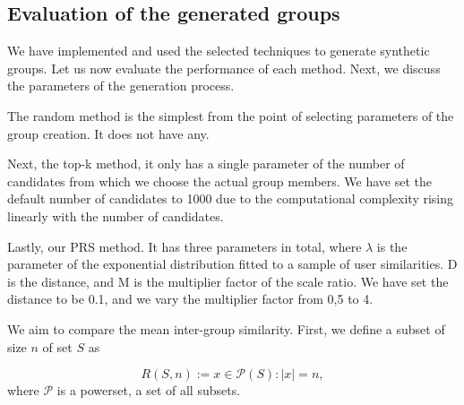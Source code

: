 

\subsection{Evaluation of the generated groups} \label{subsec:04_creation_of_artificial_groups.evaluation}

We have implemented and used the selected techniques to generate synthetic groups. Let us now evaluate the performance of each method. Next, we discuss the parameters of the generation process.

The random method is the simplest from the point of selecting parameters of the group creation. It does not have any.

Next, the top-k method, it only has a single parameter of the number of candidates from which we choose the actual group members. We have set the default number of candidates to 1000 due to the computational complexity rising linearly with the number of candidates.

Lastly, our PRS method. It has three parameters in total, where $\lambda$ is the parameter of the exponential distribution fitted to a sample of user similarities. D is the distance, and M is the multiplier factor of the scale ratio. We have set the distance to be 0.1, and we vary the multiplier factor from 0,5 to 4.

We aim to compare the mean inter-group similarity. First, we define a subset of size $n$ of set $S$ as

\begin{equation}
    R(S, n) := { x \in \mathcal{P}(S) : |x| = n},
    \end{equation}
where $\mathcal{P}$ is a powerset, a set of all subsets. 


